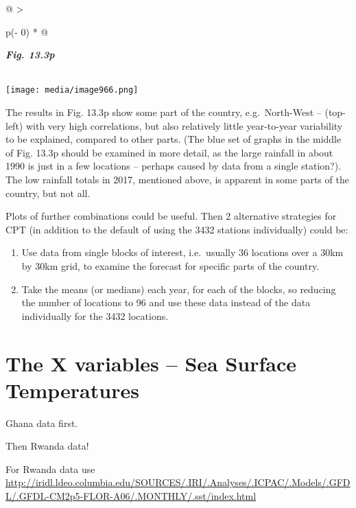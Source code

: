 \documentclass[
  letterpaper,
  DIV=11,
  numbers=noendperiod]{scrreprt}
\begin{document}
\begin{longtable}[]{@{}
  >{\raggedright\arraybackslash}p{(\columnwidth - 0\tabcolsep) * }@{}}
\toprule\noalign{}
\begin{minipage}[b]{\linewidth}\raggedright
\textbf{\emph{Fig. 13.3p}}
\end{minipage} \\
\midrule\noalign{}
\endhead
\bottomrule\noalign{}
\endlastfoot
\texttt{[image: media/image966.png]} \\
\end{longtable}

The results in Fig. 13.3p show some part of the country, e.g.~North-West
-- (top-left) with very high correlations, but also relatively little
year-to-year variability to be explained, compared to other parts. (The
blue set of graphs in the middle of Fig. 13.3p should be examined in
more detail, as the large rainfall in about 1990 is just in a few
locations -- perhaps caused by data from a single station?). The low
rainfall totals in 2017, mentioned above, is apparent in some parts of
the country, but not all.

Plots of further combinations could be useful. Then 2 alternative
strategies for CPT (in addition to the default of using the 3432
stations individually) could be:

\begin{enumerate}
\def\labelenumi{\alph{enumi})}
\item
  Use data from single blocks of interest, i.e.~usually 36 locations
  over a 30km by 30km grid, to examine the forecast for specific parts
  of the country.
\item
  Take the means (or medians) each year, for each of the blocks, so
  reducing the number of locations to 96 and use these data instead of
  the data individually for the 3432 locations.
\end{enumerate}

\section{The X variables -- Sea Surface
Temperatures}\label{the-x-variables-sea-surface-temperatures}

Ghana data first.

Then Rwanda data!

For Rwanda data use
\href{http://iridl.ldeo.columbia.edu/SOURCES/.IRI/.Analyses/.ICPAC/.Models/.GFDL/.GFDL-CM2p5-FLOR-A06/.MONTHLY/.sst/index.html}{\ul{http://iridl.ldeo.columbia.edu/SOURCES/.IRI/.Analyses/.ICPAC/.Models/.GFDL/.GFDL-CM2p5-FLOR-A06/.MONTHLY/.sst/index.html}}
\end{document}
